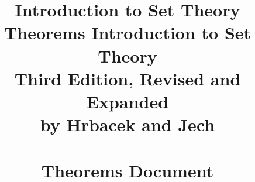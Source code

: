 
\title{Introduction to Set Theory Theorems}



\title{
  Introduction to Set Theory \\
  Third Edition, Revised and Expanded \\
  by Hrbacek and Jech \\
  \ \\
  Theorems Document
}




\newtheorem{lem}{Lemma}[subsubsection]
\newtheorem{defin}[lem]{Definition}
\newtheorem{cor}[lem]{Corollary}
\newtheorem{thrm}[lem]{Theorem}

\begin{titlingpage}
  \maketitle
\end{titlingpage}



